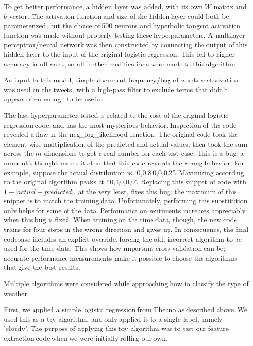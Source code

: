 \documentclass{article}
\begin{document}
To get better performance, a hidden layer was added, with its own $W$ matrix and $b$ vector. The activation function and size of the hidden layer could both be parameterized, but the choice of 500 neurons and hyperbolic tangent activation function was made without properly testing these hyperparameters. A multilayer perceptron/neural network was then constructed by connecting the output of this hidden layer to the input of the original logistic regression. This led to higher accuracy in all cases, so all further modifications were made to this algorithm.

As input to this model, simple document-frequency/bag-of-words vectorization was used on the tweets, with a high-pass filter to exclude terms that didn't appear often enough to be useful.

The last hyperparameter tested is related to the cost of the original logistic regression code, and has the most mysterious behavior. Inspection of the code revealed a flaw in the neg\_log\_likelihood function. The original code took the element-wise multiplication of the predicted and actual values, then took the sum across the $m$ dimensions to get a real number for each test case. This is a bug; a moment's thought makes it clear that this code rewards the wrong behavior. For example, suppose the actual distribution is “0,0.8,0,0,0.2”. Maximizing according to the original algorithm peaks at “0,1,0,0,0”. Replacing this snippet of code with $1 - |actual - predicted|$, at the very least, fixes this bug; the maximum of this snippet is to match the training data. Unfortunately, performing this substitution only helps for some of the data. Performance on sentiments increases appreciably when this bug is fixed. When training on the time data, though, the new code trains for four steps in the wrong direction and gives up. In consequence, the final codebase includes an explicit override, forcing the old, incorrect algorithm to be used for the time data. This shows how important cross validation can be; accurate performance measurements make it possible to choose the algorithms that give the best results.

Multiple algorithms were considered while approaching how to classify the type of weather.

First, we applied a simple logistic regression from Theano as described above. We used this as a toy algorithm, and only applied it to a single label, namely 'cloudy'. The purpose of applying this toy algorithm was to test our feature extraction code when we were initially rolling our own.
\end{document}
